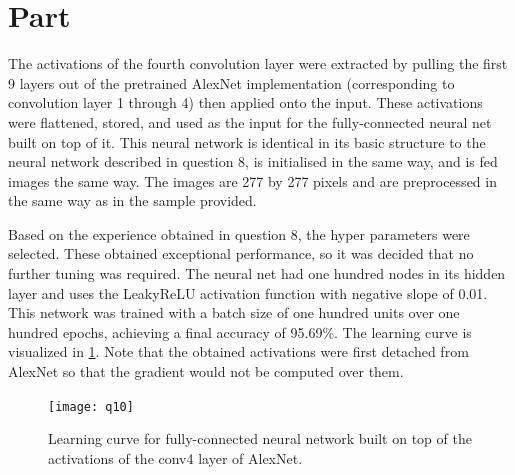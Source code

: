 \documentclass{article}
\newcommand{\enterproblemHeader}[1]{
}
\newcommand{\exitproblemHeader}[1]{
}
\newcounter{problem} %
\newcommand{\problemName}{}
\newenvironment{problem}[1][Part \theproblem]{ %
	\stepcounter{problem} %
	\renewcommand{\problemName}{#1} %
	\section{\problemName} %
	\enterproblemHeader{\problemName} %
}{
	\exitproblemHeader{\problemName} %
}
\begin{document}

\FloatBarrier
\begin{problem}
	
	The activations of the fourth convolution layer were extracted by pulling the first 9 layers out of the pretrained AlexNet implementation (corresponding to convolution layer 1 through 4) then applied onto the input. These activations were flattened, stored, and used as the input for the fully-connected neural net built on top of it. This neural network is identical in its basic structure to the neural network described in question 8, is initialised in the same way, and is fed images the same way. The images are 277 by 277 pixels and are preprocessed in the same way as in the sample provided.
	
	Based on the experience obtained in question 8, the hyper parameters were selected. These obtained exceptional performance, so it was decided that no further tuning was required. The neural net had one hundred nodes in its hidden layer and uses the LeakyReLU activation function with negative slope of 0.01. This network was trained with a batch size of one hundred units over one hundred epochs, achieving a final accuracy of 95.69\%. The learning curve is visualized in \cref{q10}. Note that the obtained activations were first detached from AlexNet so that the gradient would not be computed over them.
	
	\begin{figure}
		\texttt{[image: q10]}
		\caption{Learning curve for fully-connected neural network built on top of the activations of the conv4 layer of AlexNet.}
		\label{q10}
	\end{figure}
	
\end{problem}
\clearpage

\end{document}
